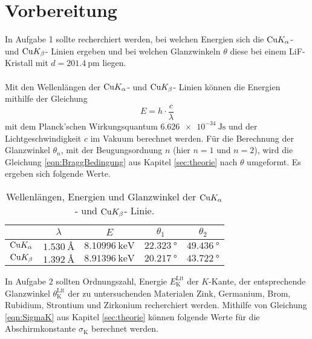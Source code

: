 \section{Vorbereitung}
\label{sec:vorbereitung}

    In Aufgabe 1 sollte recherchiert werden,
    bei welchen Energien sich die $\ce{Cu} K_\alpha$- und $\ce{Cu} K_\beta$- Linien ergeben und 
    bei welchen Glanzwinkeln $\theta$ diese bei einem LiF-Kristall mit $d = \SI{201.4}{\pico\meter}$ liegen.\\
    \\
    Mit den Wellenlängen der $\ce{Cu} K_\alpha$- und $\ce{Cu} K_\beta$- Linien können die Energien mithilfe der Gleichung
    \begin{equation}
        E = h \cdot \frac{c}{\lambda}
    \end{equation}
    mit dem Planck'schen Wirkungsquantum $\SI{6.626e-34}{\joule\second}$ und der Lichtgeschwindigkeit $c$ im Vakuum berechnet werden.
    Für die Berechnung der Glanzwinkel $\theta_n$,
    mit der Beugungsordnung $n$ (hier $n=1$ und $n=2$),
    wird die Gleichung \eqref{eqn:BraggBedingung} aus Kapitel \ref{sec:theorie} nach $\theta$ umgeformt.
    Es ergeben sich folgende Werte.

    \begin{table}
        \centering
        \caption{Wellenlängen, Energien und Glanzwinkel der $\ce{Cu} K_\alpha$- und $\ce{Cu} K_\beta$- Linie.}
        \label{tab:Vorbereitung1}
        \begin{tabular}{c c c c c}
            \toprule
            & {$\lambda$} & {$E$} & {$\theta_1$} & {$\theta_2$}\\
            \midrule
            $\ce{Cu} K_\alpha$ & $\SI{1.530}{\angstrom}$ & $\SI{8.10996}{\kilo\electronvolt}$ & $\SI{22.323}{\degree}$ & $\SI{49.436}{\degree}$\\
            $\ce{Cu} K_\beta$ & $\SI{1.392}{\angstrom}$ & $\SI{8.91396}{\kilo\electronvolt}$ & $\SI{20.217}{\degree}$ & $\SI{43.722}{\degree}$\\
            \bottomrule
        \end{tabular}
    \end{table}
    
    In Aufgabe 2 sollten Ordnungszahl, 
    Energie $E^\text{Lit}_\text{K}$ der $K$-Kante, 
    der entsprechende Glanzwinkel $\theta^\text{Lit}_\text{K}$ der zu untersuchenden Materialen Zink, 
    Germanium, Brom, Rubidium, Strontium und Zirkonium recherchiert werden.
    Mithilfe von Gleichung \eqref{eqn:SigmaK} aus Kapitel \ref{sec:theorie} können folgende Werte für die Abschirmkonstante $\sigma_\text{K}$ berechnet werden.

